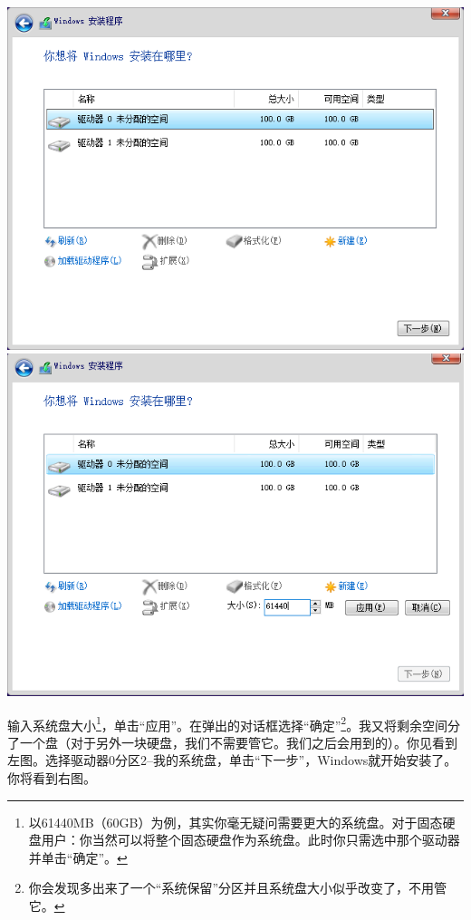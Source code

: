 \documentclass{book}
\begin{document}
\begin{center}
	\includegraphics[scale=0.45]{pic/win10setup4}	\includegraphics[scale=0.45]{pic/win10setup5}
\end{center}
输入系统盘大小\footnote{以61440MB（60GB）为例，其实你毫无疑问需要更大的系统盘。对于固态硬盘用户：你当然可以将整个固态硬盘作为系统盘。此时你只需选中那个驱动器并单击“确定”。}，单击“应用”。在弹出的对话框选择“确定”\footnote{你会发现多出来了一个“系统保留”分区并且系统盘大小似乎改变了，不用管它。{\color{red}{这里演示的是老型号机器：BIOS-Legacy的主板，设置使用主启动记录（MBR）的分区表格式安装。使用BIOS-UEFI安装过程大体相同，只是分区上多了“恢复”“系统分区”“MSR（保留）”“主分区”，你需要在“主分区”安装它。}}}。我又将剩余空间分了一个盘（对于另外一块硬盘，我们不需要管它。我们之后会用到的）。你见看到左图。选择驱动器0分区2--我的系统盘{\color{red}{（注意！重要！别选错了！）}}，单击“下一步”，Windows就开始安装了。你将看到右图。
\end{document}
